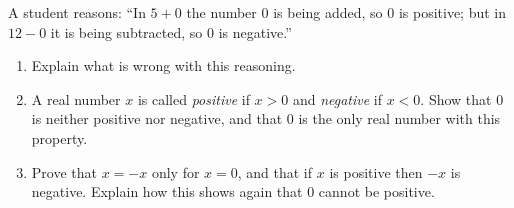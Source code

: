 A student reasons: ``In $5+0$ the number $0$ is being added, so $0$ is positive; but in $12-0$ it is being subtracted, so $0$ is negative.''
\begin{enumerate}
\item[(a)] Explain what is wrong with this reasoning.
\item[(b)] A real number $x$ is called \emph{positive} if $x>0$ and \emph{negative} if $x<0$. Show that $0$ is neither positive nor negative, and that $0$ is the only real number with this property.
\item[(c)] Prove that $x=-x$ only for $x=0$, and that if $x$ is positive then $-x$ is negative. Explain how this shows again that $0$ cannot be positive.
\end{enumerate}
